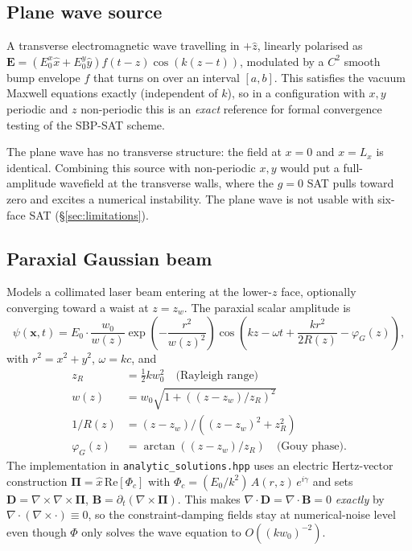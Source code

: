 \documentclass[11pt]{article}
\newcommand{\vE}{\mathbf{E}}
\newcommand{\vB}{\mathbf{B}}
\newcommand{\vD}{\mathbf{D}}
\newcommand{\vx}{\mathbf{x}}
\newcommand{\hx}{\hat{x}}
\newcommand{\hy}{\hat{y}}
\newcommand{\hz}{\hat{z}}
\begin{document}
\subsection{Plane wave source}
\label{sec:plane-wave}

A transverse electromagnetic wave travelling in $+\hz$, linearly
polarised as
$\vE = (E_0^x \hx + E_0^y \hy) f(t-z) \cos(k(z-t))$, modulated by
a $C^2$ smooth bump envelope $f$ that turns on over an interval
$[a, b]$.  This satisfies the vacuum Maxwell equations exactly
(independent of $k$), so in a configuration with $x, y$ periodic
and $z$ non-periodic this is an \emph{exact} reference for formal
convergence testing of the SBP-SAT scheme.

The plane wave has no transverse structure: the field at $x = 0$
and $x = L_x$ is identical.  Combining this source with
non-periodic $x, y$ would put a full-amplitude wavefield at the
transverse walls, where the $g = 0$ SAT pulls toward zero and
excites a numerical instability.  The plane wave is not usable
with six-face SAT (\S\ref{sec:limitations}).

\subsection{Paraxial Gaussian beam}
\label{sec:gaussian-beam}

Models a collimated laser beam entering at the lower-$z$ face,
optionally converging toward a waist at $z = z_w$.  The paraxial
scalar amplitude is
\begin{equation}
  \psi(\vx, t) = E_0 \cdot \frac{w_0}{w(z)}
    \exp\!\left(-\frac{r^2}{w(z)^2}\right)
    \cos\!\left(kz - \omega t + \frac{k r^2}{2 R(z)} - \varphi_G(z)\right),
  \label{eq:gauss-amp}
\end{equation}
with $r^2 = x^2 + y^2$, $\omega = kc$, and
\begin{align*}
  z_R &= \tfrac{1}{2} k w_0^2
            \quad\text{(Rayleigh range)} \\
  w(z)       &= w_0 \sqrt{1 + ((z-z_w)/z_R)^2} \\
  1/R(z)     &= (z-z_w) / ((z-z_w)^2 + z_R^2) \\
  \varphi_G(z)& = \arctan((z-z_w)/z_R)
            \quad\text{(Gouy phase)}.
\end{align*}
The implementation in \texttt{analytic\_solutions.hpp} uses an
electric Hertz-vector construction
$\boldsymbol{\Pi} = \hat{x}\,\mathrm{Re}[\Phi_c]$ with
$\Phi_c = (E_0/k^2)\, A(r, z)\, e^{i\gamma}$ and sets
$\vD = \nabla\times\nabla\times\boldsymbol{\Pi}$,
$\vB = \partial_t(\nabla\times\boldsymbol{\Pi})$.  This makes
$\nabla\cdot\vD = \nabla\cdot\vB = 0$ \emph{exactly} by
$\nabla\cdot(\nabla\times\cdot) \equiv 0$, so the constraint-damping
fields stay at numerical-noise level even though $\Phi$ only solves
the wave equation to $O((kw_0)^{-2})$.
\end{document}
